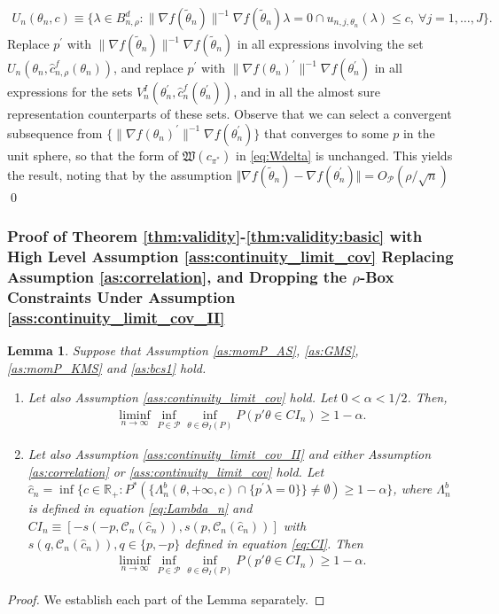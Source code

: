 \documentclass[letterpaper,11pt]{article}
\theoremstyle{myplain}
\newtheorem{lemma}{Lemma}[section]
\theoremstyle{mydefinition}
\theoremstyle{myremark}
\newcommand{\cP}{\mathcal{P}}
\numberwithin{equation}{section}
\numberwithin{figure}{section}
\begin{document}
\begin{appendices}
\begin{align*}
U_n(\theta_n,c)\equiv	\big\{\lambda\in B^d_{n,\rho}: \|\nabla f(\tilde{\theta}_n)\|^{-1}\nabla f(\tilde{\theta}_n)\lambda = 0 \cap u_{n,j,\theta_n}(\lambda)\le c, \: \forall j=1,\dots,J\big\}.
\end{align*}
Replace $p^\prime$ with $\|\nabla f(\tilde{\theta}_n)\|^{-1}\nabla f(\tilde{\theta}_n)$ in all expressions involving the set $U_n(\theta_n,\hat{c}_{n,\rho}^{f}(\theta_n))$, and replace $p^\prime$ with $\|\nabla f(\theta_n)^\prime\|^{-1}\nabla f(\theta_n^\prime)$ in all expressions for the sets $V^I_n(\theta_n^\prime,\hat{c}^f_n(\theta_n^\prime))$, and in all the almost sure representation counterparts of these sets. Observe that we can select a convergent subsequence from $\{\|\nabla f(\theta_n)^\prime\|^{-1}\nabla f(\theta_n^\prime)\}$ that converges to some $p$ in the unit sphere, so that the form of $\mathfrak W(c_{\pi^*})$ in \eqref{eq:Wdelta} is unchanged. This yields the result, noting that by the assumption $\Vert \nabla f(\tilde{\theta}_n)-\nabla f(\theta_n^\prime)\Vert = O_\cP(\rho /\sqrt{n})$
\qed
\color{black}


\subsubsection{Proof of Theorem \ref{thm:validity}-\ref{thm:validity:basic} with High Level Assumption \ref{ass:continuity_limit_cov} Replacing Assumption \ref{as:correlation}, and Dropping the $\rho$-Box Constraints Under Assumption \ref{ass:continuity_limit_cov_II}}
\label{app:proofs_alt_cont}
\begin{lemma}
\label{lem:validity_ass_cont}
Suppose that Assumption \ref{as:momP_AS}, \ref{as:GMS}, \ref{as:momP_KMS} and \ref{as:bcs1} hold.
\begin{enumerate}[label=(\Roman*)]
\item \label{lem:validity_cont_ass} Let also Assumption \ref{ass:continuity_limit_cov} hold. Let $0<\alpha < 1/2$. Then,
\begin{align*}
\liminf_{n\to\infty}\inf_{P\in\mathcal P}\inf_{\theta\in\Theta_I(P)}P(p'\theta\in CI_n)\ge 1-\alpha.
\end{align*}	
\item \label{lem:norho}
Let also Assumption \ref{ass:continuity_limit_cov_II} and either Assumption \ref{as:correlation} or \ref{ass:continuity_limit_cov} hold. Let $\hat{c}_n=\inf\{c\in\mathbb R_+:P^*(\{\Lambda_n^b (\theta ,+\infty ,c)\cap \{p^{\prime }\lambda =0\}\}\neq \emptyset)\ge 1-\alpha\}$, where $\Lambda_n^b$ is defined in equation \eqref{eq:Lambda_n} and $CI_n\equiv [-s(-p,\mathcal C_n(\hat{c}_n)),s(p,\mathcal C_n(\hat{c}_n))]$ with $s(q,\mathcal C_n(\hat{c}_n)),q\in \{p,-p\}$ defined in equation \eqref{eq:CI}. Then
\begin{align*}
\liminf_{n\to\infty}\inf_{P\in\mathcal P}\inf_{\theta\in\Theta_I(P)}P(p'\theta\in CI_n)\ge 1-\alpha.
\end{align*}
\end{enumerate} 	
\end{lemma}
\begin{proof} We establish each part of the Lemma separately.


\end{proof}
\end{appendices}
\end{document}
